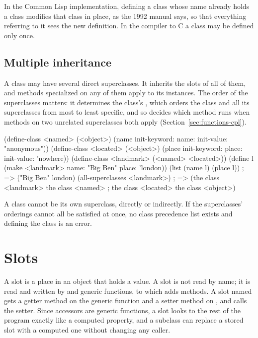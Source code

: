 In the Common Lisp implementation, defining a class whose name already
holds a class modifies that class in place, as the 1992 manual says, so
that everything referring to it sees the new definition. In the compiler to
C a class may be defined only once.

\subsection{Multiple inheritance}\label{sec:classes-multiple-inheritance}

A class may have several direct superclasses. It inherits the slots of all
of them, and methods specialized on any of them apply to its instances.
The order of the superclasses matters: it determines the class's
, which orders the class and all its
superclasses from most to least specific, and so decides which method runs
when methods on two unrelated superclasses both apply
(Section~\ref{sec:functions-cpl}).

\begin{dylan}
(define-class <named> (<object>)
  (name init-keyword: name: init-value: "anonymous"))
(define-class <located> (<object>)
  (place init-keyword: place: init-value: 'nowhere))
(define-class <landmark> (<named> <located>))
(define l (make <landmark> name: "Big Ben" place: 'london))
(list (name l) (place l))      ; => ("Big Ben" london)
(all-superclasses <landmark>)
  ; => ({the class <landmark>} {the class <named>}
  ;     {the class <located>} {the class <object>})
\end{dylan}

\noindent A class cannot be its own superclass, directly or indirectly. If
the superclasses' orderings cannot all be satisfied at once, no class
precedence list exists and defining the class is an error.

\section{Slots}\label{sec:classes-slots}

A slot is a place in an object that holds a value. A slot is not read by
name; it is read and written by  and  generic
functions, to which  adds methods. A slot named
 gets a getter method on the generic function  and a setter
method on , and  calls the setter.
Since accessors are generic functions, a slot looks to the rest of the
program exactly like a computed property, and a subclass can replace a
stored slot with a computed one without changing any caller.

